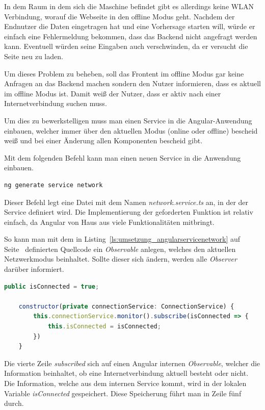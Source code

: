 In dem Raum in dem sich die Maschine befindet gibt es allerdings keine WLAN Verbindung, worauf die Webseite in den
offline Modus geht. Nachdem der Endnutzer die Daten eingetragen hat und eine Vorhersage starten will, würde er einfach
eine Fehlermeldung bekommen, dass das Backend nicht angefragt werden kann. Eventuell würden seine Eingaben auch
verschwinden, da er versucht die Seite neu zu laden.

Um dieses Problem zu beheben, soll das Frontent im offline Modus gar keine Anfragen an das Backend machen sondern den
Nutzer informieren, dass es aktuell im offline Modus ist. Damit weiß der Nutzer, dass er aktiv nach einer
Internetverbindung suchen muss.

Um dies zu bewerkstelligen muss man einen Service in die Angular-Anwendung einbauen, welcher immer über den aktuellen
Modus (online oder offline) bescheid weiß und bei einer Änderung allen Komponenten bescheid gibt.

Mit dem folgenden Befehl kann man einen neuen Service in die Anwendung einbauen.

\begin{lstlisting}[caption=Hinzufügen eines Services, label=ls:umsetzung_angularaddservice]
    ng generate service network
\end{lstlisting}

Dieser Befehl legt eine Datei mit dem Namen \textit{network.service.ts} an, in der der Service definiert wird. Die
Implementierung der geforderten Funktion ist relativ einfach, da Angular von Haus aus viele Funktionalitäten mitbringt.

So kann man mit dem in Listing~\ref{ls:umsetzung_angularservicenetwork} auf
Seite~\pageref{ls:umsetzung_angularservicenetwork} definierten Quellcode ein \textit{Observable} anlegen, welches den
aktuellen Netzwerkmodus beinhaltet. Sollte dieser sich ändern, werden alle \textit{Observer} darüber informiert.

\begin{lstlisting}[language=JavaScript, caption=Funktion des Network-Services, label=ls:umsetzung_angularservicenetwork]
    public isConnected = true;

    constructor(private connectionService: ConnectionService) {
        this.connectionService.monitor().subscribe(isConnected => {
            this.isConnected = isConnected;
        })
    }
\end{lstlisting}

Die vierte Zeile \textit{subscribed} sich auf einen Angular internen \textit{Observable}, welcher die Information
beinhaltet, ob eine Internetverbindung aktuell besteht oder nicht. Die Information, welche aus dem internen Service
kommt, wird in der lokalen Variable \textit{isConnected} gespeichert. Diese Speicherung führt man in Zeile fünf durch.

